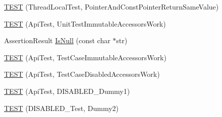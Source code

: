 \begin{DoxyCompactItemize}
\item 
\mbox{\hyperlink{namespacetesting_1_1internal_aaed45d6ba960f02e8d3d042c606bc98e}{T\+E\+ST}} (Thread\+Local\+Test, Pointer\+And\+Const\+Pointer\+Return\+Same\+Value)
\item 
\mbox{\hyperlink{namespacetesting_1_1internal_a9ac879683abb06d1c0bba3a339ea2f40}{T\+E\+ST}} (Api\+Test, Unit\+Test\+Immutable\+Accessors\+Work)
\item 
Assertion\+Result \mbox{\hyperlink{namespacetesting_1_1internal_adcfd37a66bc4cb0e8291cf46e1a6c72b}{Is\+Null}} (const char $\ast$str)
\item 
\mbox{\hyperlink{namespacetesting_1_1internal_a33809333fe5b5f33c2bd56ddcdd1dbb6}{T\+E\+ST}} (Api\+Test, Test\+Case\+Immutable\+Accessors\+Work)
\item 
\mbox{\hyperlink{namespacetesting_1_1internal_a459d693357db8f8f48c26a8bee3ffb84}{T\+E\+ST}} (Api\+Test, Test\+Case\+Disabled\+Accessors\+Work)
\item 
\mbox{\hyperlink{namespacetesting_1_1internal_a9ed5f89c92532506899e3908e79af4de}{T\+E\+ST}} (Api\+Test, D\+I\+S\+A\+B\+L\+E\+D\+\_\+\+Dummy1)
\item 
\mbox{\hyperlink{namespacetesting_1_1internal_a4a84433419426d1c1b87ce998267b0d4}{T\+E\+ST}} (D\+I\+S\+A\+B\+L\+E\+D\+\_\+\+Test, Dummy2)
\end{DoxyCompactItemize}
